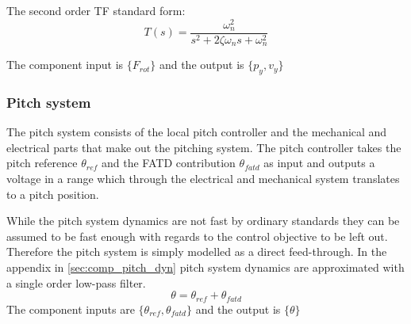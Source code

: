 \medskip
The second order TF standard form:
\begin{equation}\label{eq:std_tf}
	T(s) = \dfrac{\omega_n^2}{s^2 + 2 \zeta \omega_n s + \omega_n^2}
\end{equation}

The component input is $ \{F_{rot} \} $ and the output is $ \{p_y, v_y\} $


\subsubsection{Pitch system} \label{sec:comp_pitch}
The pitch system consists of the local pitch controller and the mechanical and electrical parts that make out the pitching system. The pitch controller takes the pitch reference $ \theta_{ref} $ and the FATD contribution $ \theta_{fatd} $ as input and outputs a voltage in a range which through the electrical and mechanical system translates to a pitch position. 

While the pitch system dynamics are not fast by ordinary standards they can be assumed to be fast enough with regards to the control objective to be left out. Therefore the pitch system is simply modelled as a direct feed-through. In the appendix in \cref{sec:comp_pitch_dyn} pitch system dynamics are approximated with a single order low-pass filter. 
\begin{equation}\label{eq:comp_pitch_freq}
	\theta = \theta_{ref} + \theta_{fatd}
\end{equation}
The component inputs are $ \{\theta_{ref}, \theta_{fatd}  \} $ and the output is $ \{\theta \} $


